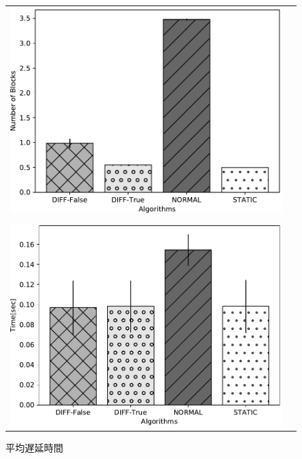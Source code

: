 \documentclass[a4j,12pt]{gradthesis_utf8}
\begin{document}
\begin{figure}[h]
	\begin{center}
		\begin{tabular}{cc}
			\begin{minipage}[t]{0.9\hsize}
				\includegraphics[width=13cm]{figure/NumberofBlocksStayinginBufferTB.pdf}
				\caption{平均非有効ブロック数}
				\label{nsb}
			\end{minipage}\\ \\
			\begin{minipage}[t]{0.9\hsize}
				\includegraphics[width=13cm]{figure/AverageDelayTimeTB.pdf}
				\caption{平均遅延時間}
				\label{adt}
			\end{minipage}\\
		\end{tabular}
	\end{center}
\end{figure}
\end{document}
